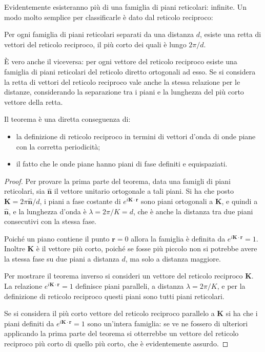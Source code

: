 Evidentemente esisteranno più di una famiglia di piani reticolari: infinite. Un modo molto semplice per classificarle è dato dal reticolo reciproco:

\begin{thm}
	\label{thm:retkvec}
	Per ogni famiglia di piani reticolari separati da una distanza $ d $, esiste una retta di vettori del reticolo reciproco, il più corto dei quali è lungo $ 2\pi/d $.
	
	\`E vero anche il viceversa: per ogni vettore del reticolo reciproco esiste una famiglia di piani reticolari del reticolo diretto ortogonali ad esso. Se si considera la retta di vettori del reticolo reciproco vale anche la stessa relazione per le distanze, considerando la separazione tra i piani e la lunghezza del più corto vettore della retta.
\end{thm}

Il teorema è una diretta conseguenza di:
\begin{itemize}
	\item la definizione di reticolo reciproco in termini di vettori d'onda di onde piane con la corretta periodicità;
	\item il fatto che le onde piane hanno piani di fase definiti e equispaziati.
\end{itemize}

\begin{proof}
	Per provare la prima parte del teorema, data una famigli di piani reticolari, sia $ \hat{\textbf{n}} $ il vettore unitario ortogonale a tali piani.
	Si ha che posto $ \textbf{K} = 2\pi\hat{\textbf{n}}/d $, i piani a fase costante di $ e^{i\textbf{K}\cdot\textbf{r}} $ sono piani ortogonali a $ \textbf{K} $, e quindi a $ \hat{\textbf{n}} $, e la lunghezza d'onda è $ \lambda = 2\pi/K = d$, che è anche la distanza tra due piani consecutivi con la stessa fase.
	
	Poiché un piano contiene il punto $ \textbf{r} = 0 $ allora la famiglia è definita da $ e^{i\textbf{K}\cdot\textbf{r}} = 1 $. Inoltre $ \textbf{K} $ è il vettore più corto, poiché se fosse più piccolo non si potrebbe avere la stessa fase su due piani a distanza $ d $, ma solo a distanza maggiore.
	
	Per mostrare il teorema inverso si consideri un vettore del reticolo reciproco $ \textbf{K} $. La relazione $ e^{i\textbf{K}\cdot\textbf{r}} = 1 $ definisce piani paralleli, a distanza $ \lambda = 2\pi/K $, e per la definizione di reticolo reciproco questi piani sono tutti piani reticolari.
	
	Se si considera il più corto vettore del reticolo reciproco parallelo a $ \textbf{K} $ si ha che i piani definiti da $ e^{i\textbf{K}\cdot\textbf{r}} = 1 $ sono un'intera famiglia: se ve ne fossero di ulteriori applicando la prima parte del teorema si otterrebbe un vettore del reticolo reciproco più corto di quello più corto, che è evidentemente assurdo.
\end{proof}

